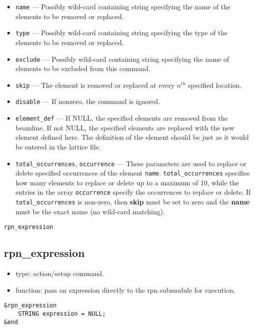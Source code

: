 \documentclass[11pt]{article}
\begin{document}
\begin{itemize}
\item \verb|name| --- Possibly wild-card containing string specifying the
	name of the elements to be removed or replaced.
\item \verb|type| --- Possibly wild-card containing string specifying the
   type of the elements to be removed or replaced.
\item \verb|exclude| --- Possibly wild-card containing string specifying 
	the name of elements to be excluded from this command.
\item \verb|skip| --- The element is removed or replaced at every $n^{th}$ 
   specified location.
\item \verb|disable| --- If nonzero, the command is ignored.
\item \verb|element_def| --- If NULL, the specified elements are removed from
   the beamline. If not NULL, the specified elements are replaced with the new element
   defined here. The definition of the element should be just as it would be entered in 
   the lattice file.
\item \verb|total_occurrences|, \verb|occurrence| --- 
These parameters are used to replace or delete specified occurrences of 
the element \verb|name|.  \verb|total_occurrences| specifies how many elements to replace
or delete up to a maximum of 10, while the entries in the array \verb|occurrence| specify the occurrences
to replace or delete. If \verb|total_occurrences| is non-zero, then {\bf skip} must
be set to zero  and the {\bf name} must be the exact name (no wild-card matching). 
\end{itemize}

\begin{latexonly}
\newpage
\begin{center}{\Large\verb|rpn_expression|}\end{center}
\end{latexonly}
\subsection{rpn\_expression \label{subsec:rpnexpression}}

\begin{itemize}
\item type: action/setup command.
\item function: pass an expression directly to the rpn submodule for execution.
\end{itemize}

\begin{verbatim}
&rpn_expression
    STRING expression = NULL;
&end
\end{verbatim}
\end{document}
